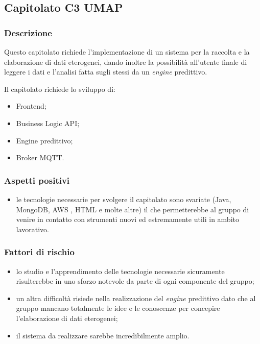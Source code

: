 \documentclass[12pt,a4paper]{article}
\begin{document}
\newpage
\subsection{Capitolato C3 UMAP}

\subsubsection{Descrizione}

Questo capitolato richiede l'implementazione di un sistema per la  raccolta e la elaborazione di dati eterogenei, dando inoltre la possibilità all'utente finale di leggere i dati e l'analisi fatta sugli stessi da un \textit{engine} predittivo.

Il capitolato richiede lo sviluppo di:
\begin{itemize}
\item Frontend;
\item Business Logic API; 
\item Engine predittivo;
\item Broker MQTT. 
\end{itemize}

\subsubsection{Aspetti positivi}
\begin{itemize}
\item le tecnologie necessarie per svolgere il capitolato sono svariate (Java, MongoDB, AWS , HTML e molte altre) il che permetterebbe al gruppo di venire in contatto con strumenti nuovi ed estremamente utili in ambito lavorativo.
\end{itemize}

\subsubsection{Fattori di rischio}

\begin{itemize}
\item lo studio e l'apprendimento delle tecnologie necessarie sicuramente risulterebbe in uno sforzo notevole da parte di ogni componente del gruppo;

\item un altra difficoltà risiede nella realizzazione del \textit{engine} predittivo dato che al gruppo mancano totalmente le idee e le conoscenze per concepire l'elaborazione di dati eterogenei;
\item il sistema da realizzare sarebbe incredibilmente amplio.
\end{itemize}
\end{document}
